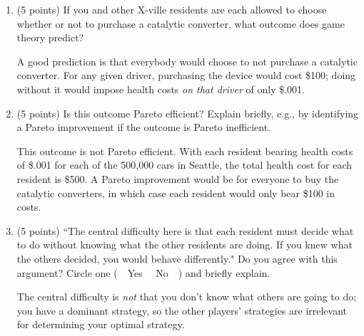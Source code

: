 \documentclass[twoside]{article}
\begin{document}
\begin{enumerate}
    \begin{enumerate}
    \item \begin{EXAM} (5 points) If you and other X-ville residents are each allowed to choose whether or not to purchase a catalytic converter, what outcome does game theory predict?  \vspace{1.5in} \end{EXAM}

\begin{KEY} A good prediction is that everybody would choose to not purchase a catalytic converter. For any given driver, purchasing the device would cost \$100; doing without it would impose health costs \emph{on that driver} of only \$.001. \end{KEY}

    \item \begin{EXAM} (5 points) Is this outcome Pareto efficient? Explain briefly, e.g., by identifying a Pareto improvement if the outcome is Pareto inefficient. \vspace{1.5in} \end{EXAM}

\begin{KEY}
This outcome is not Pareto efficient. With each resident bearing health costs of \$.001 for each of the 500,000 cars in Seattle, the total health cost for each resident is \$500. A Pareto improvement would be for everyone to buy the catalytic converters, in which case each resident would only bear \$100 in costs.
\end{KEY}

    \item \begin{EXAM} (5 points) ``The central difficulty here is that each resident must decide what to do without knowing what the other residents are doing. If you knew what the others decided, you would behave differently." Do you agree with this argument? Circle one (\ \ Yes \ \  No\ \ ) and briefly explain. \clearpage \end{EXAM}

\begin{KEY}
The central difficulty is \emph{not} that you don't know what others are going to do; you have a dominant strategy, so the other players' strategies are irrelevant for determining your optimal strategy.
\end{KEY}

\begin{comment}
    \item (5 points) In ``The Tragedy of the Commons"\hspace{-.2em}, Garrett Hardin makes a distinction between two different ways of trying to reach the optimal outcome in this type of situation: ``appeals to conscience" and ``mutual coercion, mutually agreed upon"\hspace{-.2em}. Give an example of each in the context of the current problem.
\end{comment}


\end{enumerate}
\end{enumerate}
\end{document}
